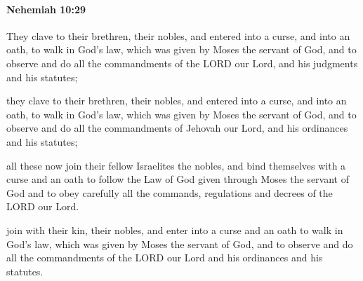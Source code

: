 		\paragraph{Nehemiah 10:29} %
			\label{NEHEMIAH-10-29}

			They clave to their brethren, their nobles, and entered into a curse, and into an oath, to walk in God’s law, which was given by Moses the servant of God, and to observe and do all the commandments of the LORD our Lord, and his judgments and his statutes;

			\begin{versebox}
					\item[BHS] 
					\item[LXX] 
					\item[ASV] they clave to their brethren, their nobles, and entered into a curse, and into an oath, to walk in God's law, which was given by Moses the servant of God, and to observe and do all the commandments of Jehovah our Lord, and his ordinances and his statutes;
					\item[NIV] all these now join their fellow Israelites the nobles, and bind themselves with a curse and an oath to follow the Law of God given through Moses the servant of God and to obey carefully all the commands, regulations and decrees of the LORD our Lord.
					\item[NRSV] join with their kin, their nobles, and enter into a curse and an oath to walk in God’s law, which was given by Moses the servant of God, and to observe and do all the commandments of the LORD our Lord and his ordinances and his statutes.
			\end{versebox}

